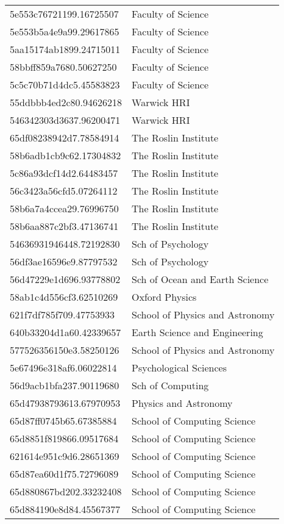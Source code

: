\begin{tabular}{ll}
5e553c76721199.16725507 & Faculty of Science \\
5e553b5a4e9a99.29617865 & Faculty of Science \\
5aa15174ab1899.24715011 & Faculty of Science \\
58bbff859a7680.50627250 & Faculty of Science \\
5c5c70b71d4dc5.45583823 & Faculty of Science \\
55ddbbb4ed2c80.94626218 & Warwick HRI \\
546342303d3637.96200471 & Warwick HRI \\
65df08238942d7.78584914 & The Roslin Institute \\
58b6adb1cb9c62.17304832 & The Roslin Institute \\
5c86a93dcf14d2.64483457 & The Roslin Institute \\
56c3423a56cfd5.07264112 & The Roslin Institute \\
58b6a7a4ccea29.76996750 & The Roslin Institute \\
58b6aa887c2bf3.47136741 & The Roslin Institute \\
54636931946448.72192830 & Sch of Psychology \\
56df3ae16596e9.87797532 & Sch of Psychology \\
56d47229e1d696.93778802 & Sch of Ocean and Earth Science \\
58ab1c4d556cf3.62510269 & Oxford Physics \\
621f7df785f709.47753933 & School of Physics and Astronomy \\
640b33204d1a60.42339657 & Earth Science and Engineering \\
577526356150e3.58250126 & School of Physics and Astronomy \\
5e67496e318af6.06022814 & Psychological Sciences \\
56d9acb1bfa237.90119680 & Sch of Computing \\
65d47938793613.67970953 & Physics and Astronomy \\
65d87ff0745b65.67385884 & School of Computing Science \\
65d8851f819866.09517684 & School of Computing Science \\
621614e951c9d6.28651369 & School of Computing Science \\
65d87ea60d1f75.72796089 & School of Computing Science \\
65d880867bd202.33232408 & School of Computing Science \\
65d884190e8d84.45567377 & School of Computing Science \\

\end{tabular}
